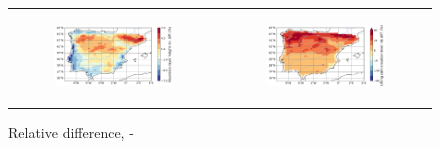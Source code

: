 \begin{figure}[htbp]
\begin{tabular}{cc}
        \begin{subfigure}[b]{0.5\textwidth}
            \caption{}
            \includegraphics[width=\textwidth]{images/chap4/future/reldiffmap_s_pblh_presfut.png}
        \end{subfigure} &
        \begin{subfigure}[b]{0.5\textwidth}
            \caption{}
            \includegraphics[width=\textwidth]{images/chap4/future/reldiffmap_s_lcl_presfut.png}
        \end{subfigure} \\
    \end{tabular}
    \caption{Relative difference, \futnoirr - \presnoirr}
    \label{fig:reldiffmaps_present_future}
\end{figure}


